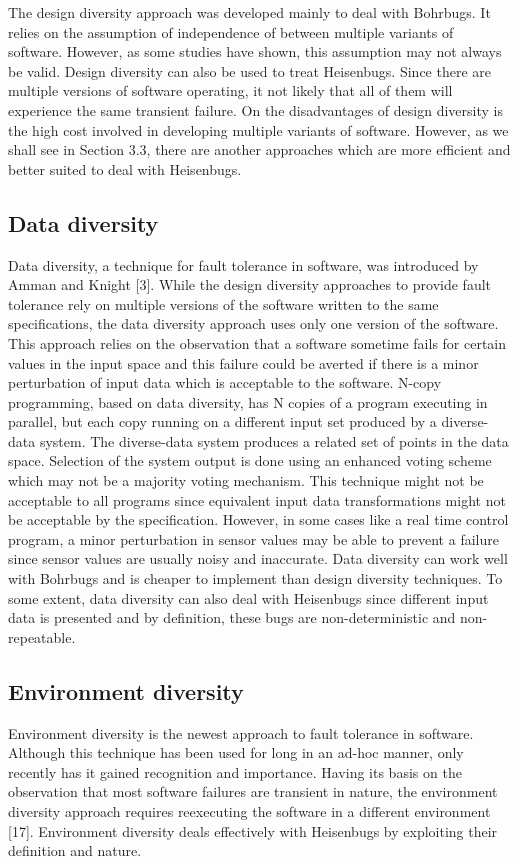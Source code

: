 \documentclass[oneside, a4paper, 11pt]{memoir}
\begin{document}
The design diversity approach was developed mainly to deal with Bohrbugs. It relies on the assumption of independence of between multiple variants of software. However, as some studies have shown, this assumption may not always be valid. Design diversity can also be used to treat Heisenbugs. Since there are multiple versions of software operating, it not likely that all of them will experience the same transient failure. On the disadvantages of design diversity is the high cost involved in developing multiple variants of software. However, as we shall see in Section 3.3, there are another approaches which are more efficient and better suited to deal with Heisenbugs.

\subsection{Data diversity}
Data diversity, a technique for fault tolerance in software, was introduced by Amman and Knight [3]. While the design diversity approaches to provide fault tolerance rely on multiple versions of the software written to the same specifications, the data diversity approach uses only one version of the software. This approach relies on the observation that a software sometime fails for certain values in the input space and this failure could be averted if there is a minor perturbation of input data which is acceptable to the software. N-copy programming, based on data diversity, has N copies of a program executing in parallel, but each copy running on a different input set produced by a diverse-data system. The diverse-data system produces a related set of points in the data space. Selection of the system output is done using an enhanced voting scheme which may not be a majority voting mechanism. This technique might not be acceptable to all programs since equivalent input data transformations might not be acceptable by the specification. However, in some cases like a real time control program, a minor perturbation in sensor values may be able to prevent a failure since sensor values are usually noisy and inaccurate.
Data diversity can work well with Bohrbugs and is cheaper to implement than design diversity techniques. To some extent, data diversity can also deal with Heisenbugs since different input data is presented and by definition, these bugs are non-deterministic and non-repeatable.

\subsection{Environment diversity}
Environment diversity is the newest approach to fault tolerance in software. Although this technique has been used for long in an ad-hoc manner, only recently has it gained recognition and importance. Having its basis on the observation that most software failures are transient in nature, the environment diversity approach requires reexecuting the software in a different environment [17]. Environment diversity deals effectively with Heisenbugs by exploiting their definition and nature.
\end{document}
